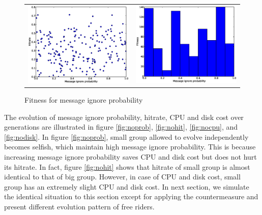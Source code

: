 \documentclass[12pt,journal,draftcls,letterpaper,onecolumn]{IEEEtran}
\begin{document}
\begin{center}
\begin{figure}[ht]
\centering
\begin{tabular}{c c}
\begin{minipage}[t]{2in}
\centering
\includegraphics[width=2.5in]{hitrate1}
\caption{Hitrate for message ignore probability}
\label{fig:nohitrate}
\end{minipage}
&\begin{minipage}[t]{2in}
\centering
\includegraphics[width=2.5in]{fitness1}
\label{fig:fitness1}
\caption{Fitness for message ignore probability}
\end{minipage}
\end{tabular}
\end{figure}
\end{center}

The evolution of message ignore probability, hitrate, CPU and disk cost over generations are
illustrated in figure \ref{fig:noprob}, \ref{fig:nohit}, \ref{fig:nocpu}, and \ref{fig:nodisk}. 
In figure \ref{fig:noprob}, small group allowed to evolve independently becomes selfish, 
which maintain high message ignore probability. This is because increasing
message ignore probability saves CPU and disk cost but does not hurt its hitrate. In fact,
figure \ref{fig:nohit} shows that hitrate of small group is almost identical to that of big group. However,
in case of CPU and disk cost, small group has an extremely slight CPU and disk cost. In next
section, we simulate the identical situation to this section except for applying the
countermeasure and present different evolution pattern of free riders.
\end{document}
